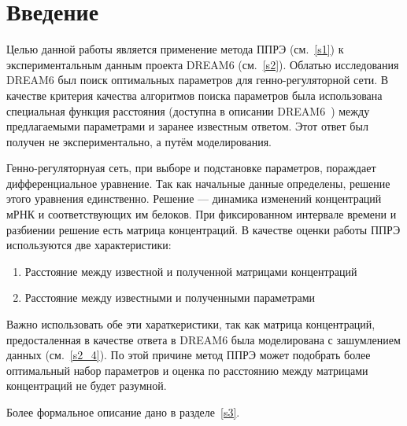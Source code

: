 \chapter*{Введение}							%

Целью данной работы является применение метода ППРЭ (см.~\ref{s1}) к 
экспериментальным данным проекта DREAM6 (см.~\ref{s2}). Облатью исследования 
DREAM6 был поиск оптимальных параметров для генно-регуляторной сети. В качестве 
критерия качества алгоритмов поиска параметров была использована специальная 
функция расстояния (доступна в описании DREAM6~\cite{bibDREAM}) между 
предлагаемыми параметрами и заранее известным ответом. Этот ответ был получен не
экспериментально, а путём моделирования.

Генно-регуляторнуая сеть, при выборе и подстановке параметров, пораждает 
дифференциальное уравнение. Так как начальные данные определены, решение этого 
уравнения единственно. Решение — динамика изменений концентраций мРНК и 
соответствующих им белоков. При фиксированном интервале времени и разбиении 
решение есть матрица концентраций. В качестве оценки работы ППРЭ используются
две характеристики: 
\begin{enumerate}
	\item Расстояние между известной и полученной матрицами концентраций
	\item Расстояние между известными и полученными параметрами
\end{enumerate}
Важно использовать обе эти хараткеристики, так как матрица концентраций, 
предосталенная в качестве ответа в DREAM6 была моделирована с зашумлением данных
(см.~\ref{s2_4}). По этой причине метод ППРЭ может подобрать более оптимальный 
набор параметров и оценка по расстоянию между матрицами концентраций не будет 
разумной.

Более формальное описание дано в разделе~\ref{s3}.

\clearpage
